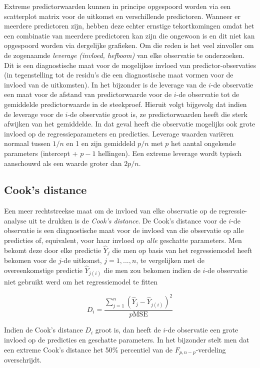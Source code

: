 \documentclass[
  12pt,dutch,coursenotes]{book}
\begin{document}
Extreme predictorwaarden kunnen in principe opgespoord worden via een scatterplot matrix voor de uitkomst en verschillende predictoren. Wanneer er meerdere predictoren zijn, hebben deze echter ernstige tekortkomingen omdat het een combinatie van meerdere predictoren kan zijn die ongewoon is en dit niet kan opgespoord worden via dergelijke grafieken. Om die reden is het veel zinvoller om de zogenaamde \emph{leverage (invloed, hefboom)} van elke observatie te onderzoeken. Dit is een diagnostische maat voor de mogelijkse invloed van predictor-observaties (in tegenstelling tot de residu's die een diagnostische maat vormen voor de invloed van de uitkomsten). In het bijzonder is de leverage van de \(i\)-de observatie een maat voor de afstand van predictorwaarde voor de \(i\)-de observatie tot de gemiddelde predictorwaarde in de steekproef. Hieruit volgt bijgevolg dat indien de leverage voor de \(i\)-de observatie groot is, ze predictorwaarden heeft die sterk afwijken van het gemiddelde. In dat geval heeft die observatie mogelijks ook grote invloed op de regressieparameters en predicties. Leverage waarden variëren normaal tussen \(1/n\) en 1 en zijn gemiddeld \(p/n\) met \(p\) het aantal ongekende parameters (intercept + \(p-1\) hellingen). Een extreme leverage wordt typisch aanschouwd als een waarde groter dan \(2p/n\).

\hypertarget{cooks-distance}{%
\subsection{Cook's distance}\label{cooks-distance}}

Een meer rechtstreekse maat om de invloed van elke observatie op de regressie-analyse uit te drukken is de \emph{Cook's distance}. De Cook's distance voor de \(i\)-de observatie is een diagnostische maat voor de invloed van die observatie op alle predicties of, equivalent, voor haar invloed op \emph{alle} geschatte parameters. Men bekomt deze door elke predictie \(\hat{Y}_j\) die men op basis van het regressiemodel heeft bekomen voor de \(j\)-de uitkomst, \(j=1,...,n\), te vergelijken met de overeenkomstige predictie \(\hat{Y}_{j(i)}\) die men zou bekomen indien de \(i\)-de observatie niet gebruikt werd om het regressiemodel te fitten

\[
D_i=\frac{\sum_{j=1}^n(\hat{Y}_j-\hat{Y}_{j(i)})^2}{p\textrm{MSE}}
\]

Indien de Cook's distance \(D_i\) groot is, dan heeft de \(i\)-de observatie een grote invloed op de predicties en geschatte parameters. In het bijzonder stelt men dat een extreme Cook's distance het 50\% percentiel van de \(F_{p,n-p}\)-verdeling overschrijdt.
\end{document}
